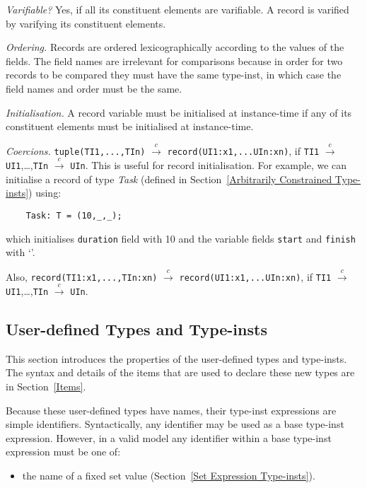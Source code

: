 \documentclass[10pt]{scrartcl}
\newcommand{\underscore}{\texttt{\n{}}}
\newcommand{\TyThing}[1]{\vspace{1.2mm}\noindent\emph{#1} }
\newcommand{\TyVarifiable}{\TyThing{Varifiable?}}
\newcommand{\TyOrdering}{\TyThing{Ordering.}}
\newcommand{\TyInit}{\TyThing{Initialisation.}}
\newcommand{\TyCoercions}{\TyThing{Coercions.}}
\newcommand{\coerce}[2]{#1 $\stackrel{c}{\rightarrow}$ #2}
\begin{document}
{\TyVarifiable
Yes, if all its constituent elements are varifiable.  A record is varified
by varifying its constituent elements.

\TyOrdering
Records are ordered lexicographically according to the values of the fields.
The field names are irrelevant for comparisons because in order for two
records to be compared they must have the same type-inst, in which case the
field names and order must be the same.

\TyInit
A record variable must be initialised at instance-time if any of its
constituent elements must be initialised at instance-time.

\TyCoercions
\coerce{\texttt{tuple(TI1,...,TIn)}}{\texttt{record(UI1:x1,...UIn:xn)}}, if
\coerce{\texttt{TI1}}{\texttt{UI1}},\ldots,\coerce{\texttt{TIn}}{\texttt{UIn}}.
This is useful for record initialisation.  For example, we can initialise a
record of type \emph{Task} (defined in Section~\ref{Arbitrarily
Constrained Type-insts}) using:
\begin{verbatim}
    Task: T = (10,_,_);
\end{verbatim}
which initialises \texttt{duration} field with 10 and the variable
fields \texttt{start} and \texttt{finish} with `\underscore'.

Also,
\coerce{\texttt{record(TI1:x1,...,TIn:xn)}}
       {\texttt{record(UI1:x1,...UIn:xn)}}, if
\coerce{\texttt{TI1}}{\texttt{UI1}},\ldots,\coerce{\texttt{TIn}}{\texttt{UIn}}.

\subsection{User-defined Types and Type-insts}
     \label{User-defined Types}
This section introduces the properties of the user-defined types and
type-insts.  The syntax and details of the items that are used to declare
these new types are in Section~\ref{Items}.

Because these user-defined types have names, their type-inst expressions
are simple identifiers.  Syntactically, any identifier may be used as a base
type-inst expression.  However, in a valid model any identifier within a
base type-inst expression must be one of:
\begin{itemize}
\item the name of a fixed set value (Section~\ref{Set Expression Type-insts}).
\end{itemize}


}
\end{document}
